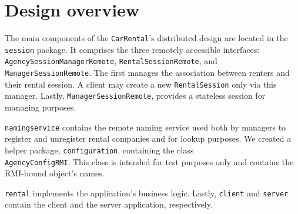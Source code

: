 \section{Design overview}
The main components of the \texttt{CarRental}'s distributed design are located in the \texttt{session} package. It comprises the three remotely accessible interfaces: \texttt{AgencySessionManagerRemote}, \texttt{RentalSessionRemote}, and \texttt{ManagerSessionRemote}. The first manages the association between renters and their rental session. A client may create a new \texttt{RentalSession} only via this manager. Lastly, \texttt{ManagerSessionRemote}, provides a stateless session for managing purposes. 

\texttt{namingservice} contains the remote naming service used both by managers to register and unregister rental companies and for lookup purposes. We created a helper package, \texttt{configuration}, containing the class \\\texttt{AgencyConfigRMI}. This class is intended for test purposes only and contains the RMI-bound object's names.

\texttt{rental} implements the application's business logic. Lastly, \texttt{client} and \texttt{server} contain the client and the server application, respectively.